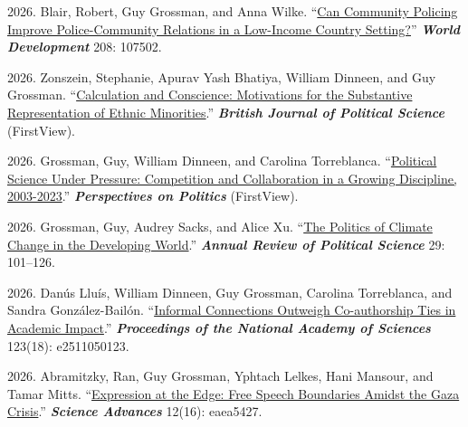 \documentclass[10pt,a4paper]{article}
\begin{document}
\begin{etaremune}[leftmargin=2.5em, itemsep=8pt, topsep=4pt]

\item \textcolor{secondary}{2026.} Blair, Robert, Guy Grossman, and Anna Wilke. ``\href{https://www.sciencedirect.com/science/article/pii/S0305750X26001920}{Can Community Policing Improve Police-Community Relations in a Low-Income Country Setting?}'' \textbf{\textit{World Development}} 208: 107502.

\item \textcolor{secondary}{2026.} Zonszein, Stephanie, Apurav Yash Bhatiya, William Dinneen, and Guy Grossman. ``\href{https://www.cambridge.org/core/journals/british-journal-of-political-science/article/calculation-and-conscience-motivations-for-the-substantive-representation-of-ethnic-minorities/EF97E64A97BAF7702E5C6308CAAF0CBF}{Calculation and Conscience: Motivations for the Substantive Representation of Ethnic Minorities}.'' \textbf{\textit{British Journal of Political Science}} (FirstView).

\item \textcolor{secondary}{2026.} Grossman, Guy, William Dinneen, and Carolina Torreblanca. ``\href{https://doi.org/10.1017/S1537592725104179}{Political Science Under Pressure: Competition and Collaboration in a Growing Discipline, 2003-2023}.'' \textbf{\textit{Perspectives on Politics}} (FirstView).

\item \textcolor{secondary}{2026.} Grossman, Guy, Audrey Sacks, and Alice Xu. ``\href{https://www.annualreviews.org/content/journals/10.1146/annurev-polisci-032624-014810}{The Politics of Climate Change in the Developing World}.'' \textbf{\textit{Annual Review of Political Science}} 29: 101--126.

\item \textcolor{secondary}{2026.} Dan\'{u}s Llu\'{i}s, William Dinneen, Guy Grossman, Carolina Torreblanca, and Sandra Gonz\'{a}lez-Bail\'{o}n. ``\href{https://www.pnas.org/doi/10.1073/pnas.2511050123}{Informal Connections Outweigh Co-authorship Ties in Academic Impact}.'' \textbf{\textit{Proceedings of the National Academy of Sciences}} 123(18): e2511050123.

\item \textcolor{secondary}{2026.} Abramitzky, Ran, Guy Grossman, Yphtach Lelkes, Hani Mansour, and Tamar Mitts. ``\href{https://www.science.org/doi/10.1126/sciadv.aea5427}{Expression at the Edge: Free Speech Boundaries Amidst the Gaza Crisis}.'' \textbf{\textit{Science Advances}} 12(16): eaea5427.


\end{etaremune}
\end{document}
